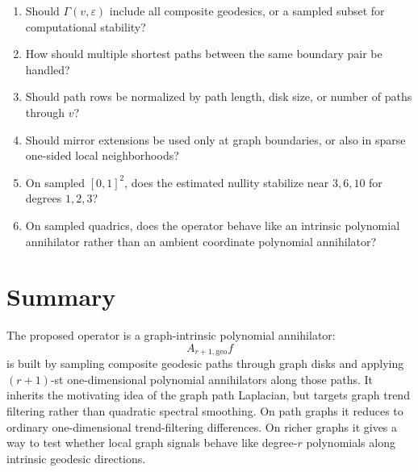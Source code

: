 \documentclass[11pt]{article}
\newcommand{\Geo}{\Gamma}
\newcommand{\eps}{\varepsilon}
\begin{document}
\begin{enumerate}
  \item Should \(\Geo(v,\eps)\) include all composite geodesics, or a sampled
        subset for computational stability?
  \item How should multiple shortest paths between the same boundary pair be
        handled?
  \item Should path rows be normalized by path length, disk size, or number of
        paths through \(v\)?
  \item Should mirror extensions be used only at graph boundaries, or also in
        sparse one-sided local neighborhoods?
  \item On sampled \([0,1]^2\), does the estimated nullity stabilize near
        \(3,6,10\) for degrees \(1,2,3\)?
  \item On sampled quadrics, does the operator behave like an intrinsic
        polynomial annihilator rather than an ambient coordinate polynomial
        annihilator?
\end{enumerate}

\section{Summary}

The proposed operator is a graph-intrinsic polynomial annihilator:
\[
  A_{r+1,\mathrm{geo}}f
\]
is built by sampling composite geodesic paths through graph disks and applying
\((r+1)\)-st one-dimensional polynomial annihilators along those paths.  It
inherits the motivating idea of the graph path Laplacian, but targets graph
trend filtering rather than quadratic spectral smoothing.  On path graphs it
reduces to ordinary one-dimensional trend-filtering differences.  On richer
graphs it gives a way to test whether local graph signals behave like
degree-\(r\) polynomials along intrinsic geodesic directions.
\end{document}
